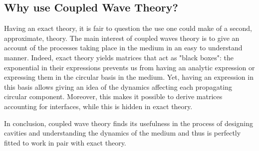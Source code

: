 \subsection{Why use Coupled Wave Theory?}
Having an exact theory, it is fair to question the use one could make of a second, approximate, theory. The main interest of coupled waves theory is to give an account of the processes taking place in the medium in an easy to understand manner. Indeed, exact theory yields matrices that act as "black boxes": the exponential in their expressions prevents us from having an analytic expression or expressing them in the circular basis in the medium. Yet, having an expression in this basis allows giving an idea of the dynamics affecting each propagating circular component. Moreover, this makes it possible to derive matrices accounting for interfaces, while this is hidden in exact theory.

In conclusion, coupled wave theory finds its usefulness in the process of designing cavities and understanding the dynamics of the medium and thus is perfectly fitted to work in pair with exact theory.